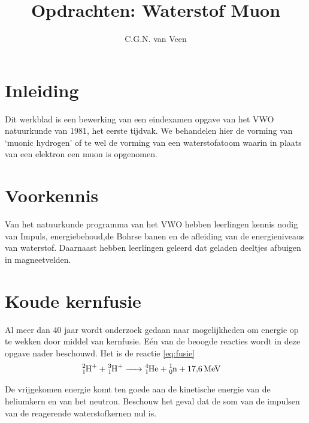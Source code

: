 

\usepackage{hepnames} 
\usepackage[version=3]{mhchem}
\usepackage{lipsum}
\usepackage{pgfplots}
\usepackage{amsmath}

\DeclareRobustCommand{\PgDpp}{\HepParticle{\Delta}{}{++}\xspace}

\title{Opdrachten: Waterstof Muon} 
\author{C.G.N. van Veen}



\maketitle

\section{Inleiding} Dit werkblad is een bewerking van een eindexamen
opgave van het VWO natuurkunde van 1981, het eerste tijdvak. We
behandelen hier de vorming van `muonic hydrogen' of te wel de vorming
van een waterstofatoom waarin in plaats van een elektron een muon is
opgenomen.
\section{Voorkennis}

Van het natuurkunde programma van het VWO hebben leerlingen kennis nodig van Impuls, 
energiebehoud,de Bohrse banen en de afleiding van de energieniveaus van waterstof.
Daarnaast hebben leerlingen geleerd dat geladen deeltjes afbuigen in magneetvelden.

\section{Koude kernfusie}

Al meer dan 40 jaar wordt onderzoek gedaan naar mogelijkheden om energie
op te wekken door middel van kernfusie. Eén van de beoogde reacties
wordt in deze opgave nader beschouwd. Het is de reactie \ref{eq:fusie}
\begin{align} 
\cee{ \label{eq:fusie} 
^2_1H+ + ^3_1H+ &-> ^4_1He + ^1_0n + \SI{17,6}{\mega\electronvolt}
}
\end{align}

De vrijgekomen energie komt ten goede aan de kinetische energie van de heliumkern en van het neutron.
Beschouw het geval dat de som van de impulsen van de reagerende waterstofkernen nul is.


